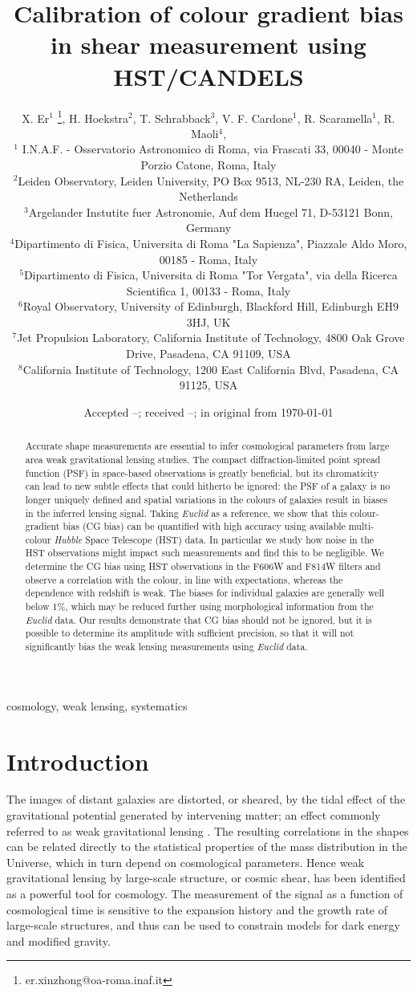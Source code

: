 \documentclass[useAMS,usenatbib]{mnras}
\title[Colour gradient bias]
{Calibration of colour gradient bias in shear measurement using HST/CANDELS}
\author[X. Er et al.]%
{
X. Er$^1$ \thanks{er.xinzhong@oa-roma.inaf.it},
H. Hoekstra$^2$, T. Schrabback$^3$, V. F. Cardone$^1$, R. Scaramella$^1$, R. Maoli$^4$,
\newauthor{M. Vicinanza$^{1,4,5}$, B. Gillis$^{6}$ J. Rhodes$^{7,8}$}
\\
$^1$ I.N.A.F. - Osservatorio Astronomico di Roma, via Frascati 33, 00040 - Monte Porzio Catone, Roma, Italy\\
$^2$Leiden Observatory, Leiden University, PO Box 9513, NL-230 RA, Leiden, the Netherlands \\
$^3$Argelander Instutite fuer Astronomie, Auf dem Huegel 71, D-53121 Bonn, Germany\\
$^4$Dipartimento di Fisica, Universita di Roma "La Sapienza", Piazzale Aldo Moro, 00185 - Roma, Italy\\
$^5$Dipartimento di Fisica, Universita di Roma "Tor Vergata", via della Ricerca Scientifica 1, 00133 - Roma, Italy\\
$^6$Royal Observatory, University of Edinburgh, Blackford Hill, Edinburgh EH9 3HJ, UK\\
$^7$Jet Propulsion Laboratory, California Institute of Technology, 4800 Oak Grove Drive, Pasadena, CA 91109, USA\\
$^8$California Institute of Technology, 1200 East California Blvd, Pasadena, CA 91125, USA
}
\date{Accepted --;  received --;  in original from \today}
\begin{document}
\maketitle

\begin{abstract}
Accurate shape measurements are essential to infer cosmological parameters from large area weak gravitational lensing studies. The compact diffraction-limited point spread function (PSF) in space-based observations is greatly beneficial, but its chromaticity can lead to new subtle effects that could hitherto be ignored: the PSF of a galaxy is no longer uniquely defined  and spatial variations in the colours of galaxies result in biases in the inferred lensing signal. Taking {\it Euclid} as a reference, we show that this colour-gradient bias (CG bias) can be quantified with high accuracy using available multi-colour {\it Hubble} Space Telescope (HST) data. In particular we study how noise in the HST observations might impact such measurements and find this to be negligible. We determine the CG bias using HST observations in the F606W and F814W filters and observe a correlation with the colour, in line with expectations, whereas the dependence with redshift is weak. The biases for individual galaxies are generally well below 1\%, which may be reduced further using morphological information from the {\it Euclid} data. Our results demonstrate that CG bias should not be ignored, but it is possible to determine its amplitude with sufficient precision, so that it will not significantly bias the weak lensing measurements using {\it Euclid} data.
\end{abstract}
\begin{keywords} cosmology, weak lensing, systematics
\end{keywords}


\section{Introduction}

The images of distant galaxies are distorted, or sheared, by the tidal effect of the gravitational  potential generated by intervening matter; an effect commonly referred to as weak gravitational lensing \citep[see e.g.][for a detailed introduction]{Bartelmann01}. The resulting correlations in the shapes can be related directly to the statistical properties of the mass distribution in the Universe, which in turn depend on cosmological parameters. Hence weak gravitational lensing by large-scale structure, or cosmic shear, has been identified as a powerful tool for cosmology. The measurement of the signal as a function of cosmological time is sensitive to the expansion history and the growth rate of large-scale structures, and thus can be used to constrain models for dark energy and modified gravity.
\end{document}
